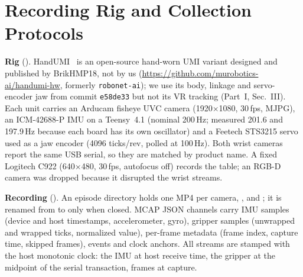 \documentclass[conference,10pt]{IEEEtran}
\begin{document}
\section{Recording Rig and Collection Protocols}\label{sec:rig}
\textbf{Rig} (). HandUMI~\cite{handumi_hw} is an open-source hand-worn
UMI variant designed and published by BrikHMP18, not by us (\url{https://github.com/murobotics-ai/handumi-hw}, formerly
\texttt{robonet-ai}); we use its body, linkage and
servo-encoder jaw from commit \texttt{e58de33} but not its VR tracking (Part~I, Sec.~III). Each unit carries an Arducam fisheye UVC
camera (1920$\times$1080, 30\,fps, MJPG), an ICM-42688-P IMU on a Teensy~4.1 (nominal 200\,Hz; measured 201.6 and 197.9\,Hz
because each board has its own oscillator) and a Feetech STS3215 servo used as a jaw encoder (4096 ticks/rev, polled at
100\,Hz). Both wrist cameras report the same USB serial, so they are matched by product name. A fixed Logitech C922
(640$\times$480, 30\,fps, autofocus off) records the table; an RGB-D camera was dropped because it disrupted the wrist streams.

\textbf{Recording} (). An episode directory holds one MP4 per camera, ,
 and ; it is renamed from  to  only when closed.
MCAP JSON channels carry IMU samples (device and host timestamps, accelerometer, gyro), gripper samples (unwrapped and wrapped
ticks, normalized value), per-frame metadata (frame index, capture time, skipped frames), events and clock anchors. All streams
are stamped with the host monotonic clock: the IMU at host receive time, the gripper at the midpoint of the serial
transaction, frames at capture.
\end{document}
